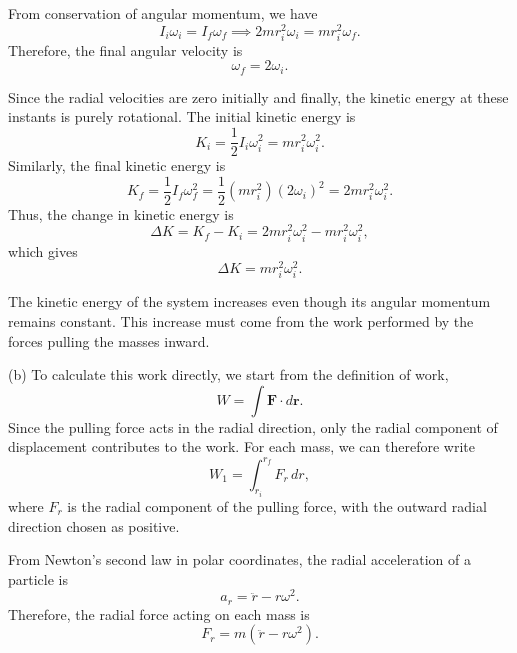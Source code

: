 \documentclass[../main.tex]{subfiles}
\begin{document}
From conservation of angular momentum, we have
\begin{equation}
    I_i\omega_i=I_f\omega_f
    \implies
    2mr_i^2\omega_i=mr_i^2\omega_f.
\end{equation}
Therefore, the final angular velocity is
\begin{equation}
    \boxed{\omega_f=2\omega_i}.
\end{equation}

Since the radial velocities are zero initially and finally, the kinetic energy at these instants is purely rotational. The initial kinetic energy is
\begin{equation}
    K_i=\frac{1}{2}I_i\omega_i^2
    =mr_i^2\omega_i^2.
\end{equation}
Similarly, the final kinetic energy is
\begin{equation}
    K_f=\frac{1}{2}I_f\omega_f^2
    =\frac{1}{2}(mr_i^2)(2\omega_i)^2
    =2mr_i^2\omega_i^2.
\end{equation}
Thus, the change in kinetic energy is
\begin{equation}
    \Delta K=K_f-K_i
    =2mr_i^2\omega_i^2-mr_i^2\omega_i^2,
\end{equation}
which gives
\begin{equation}
    \boxed{\Delta K=mr_i^2\omega_i^2}.
\end{equation}

The kinetic energy of the system increases even though its angular momentum remains constant. This increase must come from the work performed by the forces pulling the masses inward.

(b) To calculate this work directly, we start from the definition of work,
\begin{equation}
    W=\int\mathbf{F}\cdot d\mathbf{r}.
\end{equation}
Since the pulling force acts in the radial direction, only the radial component of displacement contributes to the work. For each mass, we can therefore write
\begin{equation}
    W_1=\int_{r_i}^{r_f}F_r\,dr,
\end{equation}
where $F_r$ is the radial component of the pulling force, with the outward radial direction chosen as positive.

From Newton's second law in polar coordinates, the radial acceleration of a particle is
\begin{equation}
    a_r=\ddot{r}-r\omega^2.
\end{equation}
Therefore, the radial force acting on each mass is
\begin{equation}
    F_r=m(\ddot{r}-r\omega^2).
\end{equation}
\end{document}
